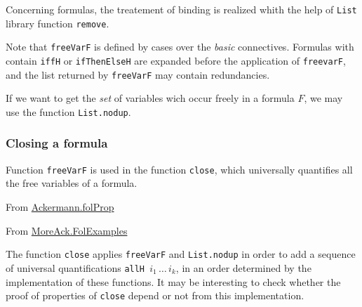
Concerning formulas, the treatement of binding is realized 
whith the help of \texttt{List} library function \texttt{remove}.


\begin{remark}
  Note that \texttt{freeVarF} is defined by cases over the \emph{basic} connectives. Formulas with contain \texttt{iffH} or
\texttt{ifThenElseH} are expanded before the application of
\texttt{freevarF}, and the 
list returned by \texttt{freeVarF} may contain redundancies.

If we want to get the \emph{set} of variables wich occur freely 
in a formula $F$, we may use the function \texttt{List.nodup}.



\end{remark}

\subsubsection{Closing a formula}
Function \texttt{freeVarF} is used in 
the  function \texttt{close}, which  universally quantifies  all the free variables of a formula.

\noindent From \href{../theories/html/hydras.Ackermann.folProp.html}{Ackermann.folProp}


\noindent From \href{../theories/html/hydras.MoreAck.FolExamples.html}{MoreAck.FolExamples}


\begin{remark}
  The function \texttt{close} applies \texttt{freeVarF} and
  \texttt{List.nodup}  in order to add a sequence of universal
  quantifications \texttt{allH $i_1\, \dots\, i_k$}, in an order determined by the implementation of these functions. It may be interesting to check whether the proof of properties of \texttt{close} depend or not from this implementation.
\end{remark}


